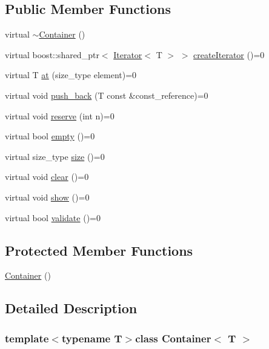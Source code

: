 \subsection*{Public Member Functions}
\begin{DoxyCompactItemize}
\item 
virtual \hyperlink{class_container_a5b3440c3177017d2d6a190724e7078ec}{$\sim$Container} ()
\item 
virtual boost::shared\_\-ptr$<$ \hyperlink{class_iterator}{Iterator}$<$ T $>$ $>$ \hyperlink{class_container_a18a0a70153781d3d94526bc09fcbedb8}{createIterator} ()=0
\item 
virtual T \hyperlink{class_container_a8aed06783f7cd0749f796c64e64626e7}{at} (size\_\-type element)=0
\item 
virtual void \hyperlink{class_container_a12ffe2d2dbbcd78b6b293756004bd6e0}{push\_\-back} (T const \&const\_\-reference)=0
\item 
virtual void \hyperlink{class_container_a5f70fb0d821a8db9a0733aafe9ef35ac}{reserve} (int n)=0
\item 
virtual bool \hyperlink{class_container_a123dcd25b363ab92ac8bfa8b4c4061a4}{empty} ()=0
\item 
virtual size\_\-type \hyperlink{class_container_a1eebc7b5cbb0c574cb1aef87c2ddba36}{size} ()=0
\item 
virtual void \hyperlink{class_container_ac27f3554d6ac6ecb227ead060ff1f8a2}{clear} ()=0
\item 
virtual void \hyperlink{class_container_a5ee85af656e60863a7e4c1f7f9c484f4}{show} ()=0
\item 
virtual bool \hyperlink{class_container_abbd8ca2714a550351442f4410cf5736d}{validate} ()=0
\end{DoxyCompactItemize}
\subsection*{Protected Member Functions}
\begin{DoxyCompactItemize}
\item 
\hyperlink{class_container_ab17ce1f67243b28abcd4c8113a72524c}{Container} ()
\end{DoxyCompactItemize}


\subsection{Detailed Description}
\subsubsection*{template$<$typename T$>$class Container$<$ T $>$}

